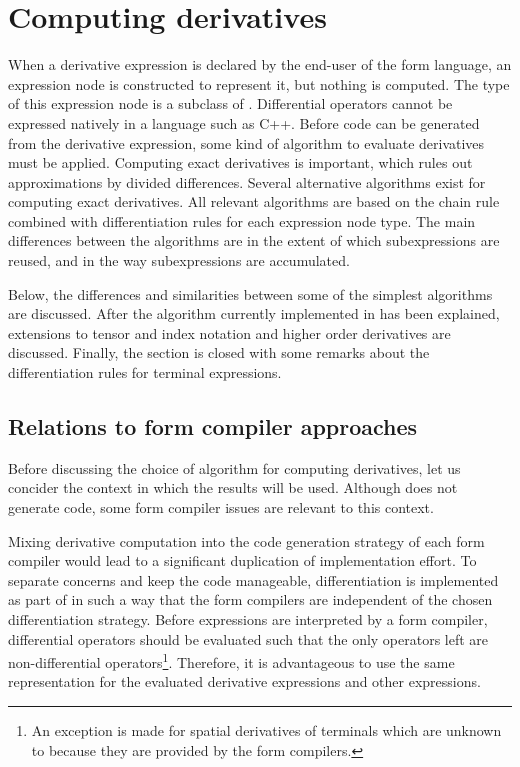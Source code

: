 \section{Computing derivatives} \label{ufl:sec:ad}

When a derivative expression is declared by the end-user of the form
language, an expression node is constructed to represent it, but
nothing is computed.  The type of this expression node is a subclass
of .  Differential operators cannot be expressed
natively in a language such as C++.  Before code can be generated from
the derivative expression, some kind of algorithm to evaluate
derivatives must be applied.  Computing exact derivatives is
important, which rules out approximations by divided differences.
Several alternative algorithms exist for computing exact
derivatives. All relevant algorithms are based on the chain rule
combined with differentiation rules for each expression node type.
The main differences between the algorithms are in the extent of which
subexpressions are reused, and in the way subexpressions are
accumulated.

Below, the differences and similarities between some of the simplest
algorithms are discussed.  After the algorithm currently implemented
in \ufl{} has been explained, extensions to tensor and index notation
and higher order derivatives are discussed.  Finally, the section is
closed with some remarks about the differentiation rules for terminal
expressions.

\subsection{Relations to form compiler approaches}
\label{ufl:sec:fcrel}

Before discussing the choice of algorithm for computing derivatives,
let us concider the context in which the results will be used.
Although \ufl{} does not generate code, some form compiler issues are
relevant to this context.

Mixing derivative computation into the code generation strategy of
each form compiler would lead to a significant duplication of
implementation effort.  To separate concerns and keep the code
manageable, differentiation is implemented as part of \ufl{} in such a
way that the form compilers are independent of the chosen
differentiation strategy.  Before expressions are interpreted by a
form compiler, differential operators should be evaluated such that
the only operators left are non-differential operators\footnote{An
  exception is made for spatial derivatives of terminals which are
  unknown to \ufl{} because they are provided by the form compilers.}.
Therefore, it is advantageous to use the same representation for the
evaluated derivative expressions and other expressions.

